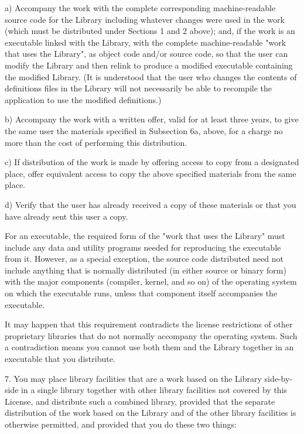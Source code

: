 \begin{indented}{1cm}
a) Accompany the work with the complete corresponding
machine-readable source code for the Library including whatever
changes were used in the work (which must be distributed under
Sections 1 and 2 above); and, if the work is an executable linked
with the Library, with the complete machine-readable "work that
uses the Library", as object code and/or source code, so that the
user can modify the Library and then relink to produce a modified
executable containing the modified Library. (It is understood
that the user who changes the contents of definitions files in the
Library will not necessarily be able to recompile the application
to use the modified definitions.)

b) Accompany the work with a written offer, valid for at
least three years, to give the same user the materials
specified in Subsection 6a, above, for a charge no more
than the cost of performing this distribution.

c) If distribution of the work is made by offering access to copy
from a designated place, offer equivalent access to copy the above
specified materials from the same place.

d) Verify that the user has already received a copy of these
materials or that you have already sent this user a copy.
\end{indented}

For an executable, the required form of the "work that uses the
Library" must include any data and utility programs needed for
reproducing the executable from it. However, as a special exception,
the source code distributed need not include anything that is normally
distributed (in either source or binary form) with the major
components (compiler, kernel, and so on) of the operating system on
which the executable runs, unless that component itself accompanies
the executable.

It may happen that this requirement contradicts the license
restrictions of other proprietary libraries that do not normally
accompany the operating system. Such a contradiction means you cannot
use both them and the Library together in an executable that you
distribute.

7. You may place library facilities that are a work based on the
Library side-by-side in a single library together with other library
facilities not covered by this License, and distribute such a combined
library, provided that the separate distribution of the work based on
the Library and of the other library facilities is otherwise
permitted, and provided that you do these two things:

